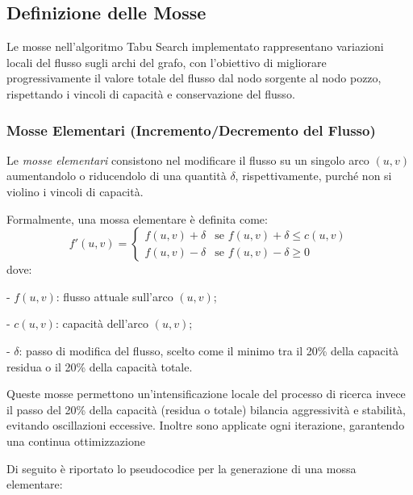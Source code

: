 \documentclass[12pt,a4paper]{article}
\begin{document}
\subsection{Definizione delle Mosse}

Le mosse nell'algoritmo Tabu Search implementato rappresentano variazioni locali del flusso sugli archi del grafo, con l'obiettivo di migliorare progressivamente il valore totale del flusso dal nodo sorgente al nodo pozzo, rispettando i vincoli di capacità e conservazione del flusso.

\subsubsection{Mosse Elementari (Incremento/Decremento del Flusso)}

Le \textit{mosse elementari} consistono nel modificare il flusso su un singolo arco $(u, v)$ aumentandolo o riducendolo di una quantità $\delta$, rispettivamente, purché non si violino i vincoli di capacità.

Formalmente, una mossa elementare è definita come:
\[
f'(u,v) = 
\begin{cases} 
f(u,v) + \delta & \text{se } f(u,v) + \delta \leq c(u,v) \\
f(u,v) - \delta & \text{se } f(u,v) - \delta \geq 0
\end{cases}
\]
dove:

    
- $ f(u,v) $: flusso attuale sull'arco $ (u,v) $;
    
- $ c(u,v) $: capacità dell'arco $ (u,v) $;
    
- $ \delta $: passo di modifica del flusso, scelto come il minimo tra il 20\% della capacità residua o il 20\% della capacità totale.

Queste mosse permettono un’intensificazione locale del processo di ricerca invece il passo del 20\% della capacità (residua o totale) bilancia aggressività e stabilità, evitando oscillazioni eccessive. Inoltre sono applicate ogni iterazione, garantendo una continua ottimizzazione

Di seguito è riportato lo pseudocodice per la generazione di una mossa elementare:
\end{document}
